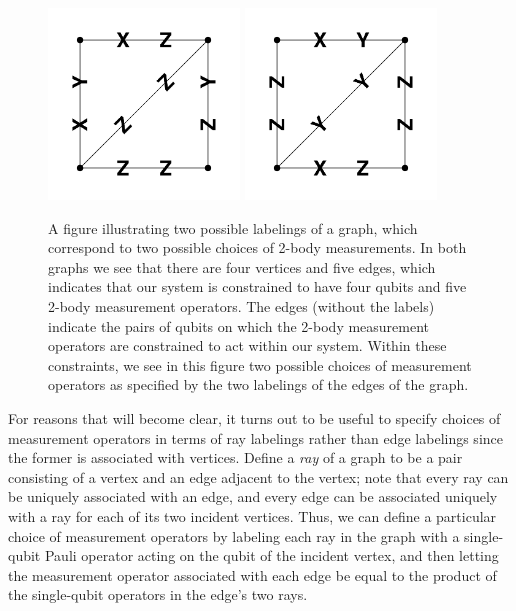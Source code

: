 \documentclass[12pt]{amsbook}
\theoremstyle{plain}
\theoremstyle{definition}
\theoremstyle{remark}
\begin{document}
\begin{figure}
\begin{center}
\includegraphics[width=2in]{images/2labelings-1}
\includegraphics[width=2in]{images/2labelings-2}
\end{center}
\caption{
\label{figure:2labelings}
A figure illustrating two possible labelings of a graph, which correspond to two possible choices of 2-body measurements.  In both graphs we see that there are four vertices and five edges, which indicates that our system is constrained to have four qubits and five 2-body measurement operators.  The edges (without the labels) indicate the pairs of qubits on which the 2-body measurement operators are constrained to act within our system.  Within these constraints, we see in this figure two possible choices of measurement operators as specified by the two labelings of the edges of the graph.
}
\end{figure}

For reasons that will become clear, it turns out to be useful to specify choices of measurement operators in terms of ray labelings rather than edge labelings since the former is associated with vertices.  Define a \emph{ray} of a graph to be a pair consisting of a vertex and an edge adjacent to the vertex;  note that every ray can be uniquely associated with an edge, and every edge can be associated uniquely with a ray for each of its two incident vertices.  Thus, we can define a particular choice of measurement operators by labeling each ray in the graph with a single-qubit Pauli operator acting on the qubit of the incident vertex, and then letting the measurement operator associated with each edge be equal to the product of the single-qubit operators in the edge's two rays.
\end{document}
